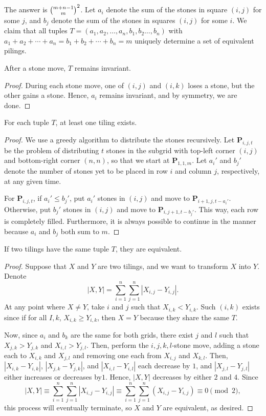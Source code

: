 The answer is $\tbinom{m+n-1}m^2$. Let $a_i$ denote the sum of the stones in square $(i,j)$ for some $j$, and $b_j$ denote the sum of the stones in squares $(i,j)$ for some $i$. We claim that all tuples $T=(a_1,a_2,\ldots,a_n,b_1,b_2\ldots,b_n)$ with $a_1+a_2+\cdots+a_n=b_1+b_2+\cdots+b_n=m$
uniquely determine a set of equivalent pilings.
\begin{boxlemma}
    After a stone move, $T$ remains invariant.
\end{boxlemma}
\begin{proof}
    During each stone move, one of $(i,j)$ and $(i,k)$ loses a stone, but the other gains a stone. Hence, $a_i$ remains invariant, and by symmetry, we are done.
\end{proof}
\begin{boxlemma}
    For each tuple $T$, at least one tiling exists.
\end{boxlemma}
\begin{proof}
    We use a greedy algorithm to distribute the stones recursively. Let $\mathbf P_{i,j,t}$ be the problem of distributing $t$ stones in the subgrid with top-left corner $(i,j)$ and bottom-right corner $(n,n)$, so that we start at $\mathbf P_{1,1,m}$. Let $a_i'$ and $b_j'$ denote the number of stones yet to be placed in row $i$ and column $j$, respectively, at any given time.

    For $\mathbf P_{i,j,t}$, if $a_i'\le b_j'$, put $a_i'$ stones in $(i,j)$ and move to $\mathbf P_{i+1,j,t-a_i'}$. Otherwise, put $b_j'$ stones in $(i,j)$ and move to $\mathbf P_{i,j+1,t-b_j'}$. This way, each row is completely filled. Furthermore, it is always possible to continue in the manner because $a_i$ and $b_j$ both sum to $m$.
\end{proof}
\begin{boxlemma}
    If two tilings have the same tuple $T$, they are equivalent.
\end{boxlemma}
\begin{proof}
    Suppose that $X$ and $Y$ are two tilings, and we want to transform $X$ into $Y$. Denote \[|X,Y|=\sum_{i=1}^n\sum_{j=1}^n\left|X_{i,j}-Y_{i,j}\right|.\]
    At any point where $X\ne Y$, take $i$ and $j$ such that $X_{i,k}<Y_{i,k}$. Such $(i,k)$ exists since if for all $I,k$, $X_{i,k}\ge Y_{i,k}$, then $X=Y$ because they share the same $T$.

    Now, since $a_i$ and $b_k$ are the same for both grids, there exist $j$ and $l$ such that $X_{j,k}>Y_{j,k}$ and $X_{i,l}>Y_{j,l}$. Then, perform the $i,j,k,l$-stone move, adding a stone each to $X_{i,k}$ and $X_{j,l}$ and removing one each from $X_{i,j}$ and $X_{k,l}$. Then, $|X_{i,k}-Y_{i,k}|$, $|X_{j,k}-Y_{j,k}|$, and $|X_{i,l}-Y_{i,l}|$ each decrease by $1$, and $|X_{j,l}-Y_{j,l}|$ either increases or decreases by$1$. Hence, $|X,Y|$ decreases by either $2$ and $4$. Since \[|X,Y|\equiv\sum_{i=1}^n\sum_{j=1}^n\left|X_{i,j}-Y_{i,j}\right|\equiv\sum_{i=1}^n\sum_{j=1}^n\left(X_{i,j}-Y_{i,j}\right)\equiv 0\pmod2,\]
    this process will eventually terminate, so $X$ and $Y$ are equivalent, as desired.
\end{proof}

